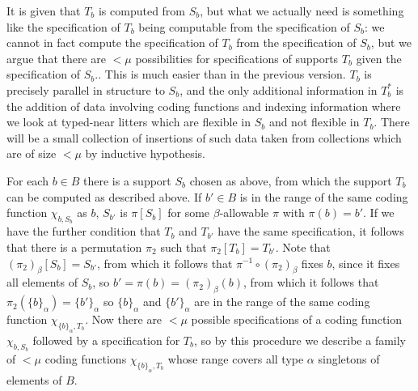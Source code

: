 \documentclass[112pt]{article}
\begin{document}
\begin{description}
It is given that $T_b$ is computed from
$S_b$, but what we actually need is something like the specification of $T_b$ being computable from the specification of $S_b$:  we cannot in fact compute the specification of $T_b$ from the specification of $S_b$, but we argue that there are $<\mu$ possibilities for specifications of supports $T_b$ given the specification of $S_b$..   This is much easier than in the previous version.
$T_b$ is precisely parallel in structure to $S_b$, and the only additional information in $T_b^*$  is the addition of data involving coding functions and indexing information where we look at typed-near litters which are flexible in $S_b$ and not flexible in $T_b$.  There will be a small collection of insertions of such data taken from collections which are of size $<\mu$ by inductive hypothesis.



For each $b \in B$ there is a support $S_b$ chosen as above, from which the support $T_b$ can be computed as described above.  If $b' \in B$ is in the range of the same coding function $\chi_{b,S_b}$ as $b$, $S_{b'}$ is $\pi[S_{b}]$ for some $\beta$-allowable $\pi$ with $\pi(b) = b'$.
If we have the further condition that $T_b$ and $T_{b'}$ have the same specification, it follows that there is a permutation $\pi_2$ such that $\pi_2[T_b] = T_{b'}$.  Note that $(\pi_2)_\beta[S_b]=S_{b'}$, from which it follows that $\pi^{-1} \circ (\pi_2)_\beta$ fixes $b$, since it fixes all elements of $S_b$, so $b'=\pi(b) = (\pi_2)_\beta(b)$, from which it follows
that $\pi_2(\{b\}_\alpha) = \{b'\}_\alpha$ so $\{b\}_\alpha$ and $\{b'\}_\alpha$ are in the range of the same coding function $\chi_{\{b\}_\alpha,T_b}$.  Now there are $<\mu$ possible specifications of a coding function $\chi_{b,S_b}$ followed by a specification for $T_b$, so by this procedure we describe a family of $<\mu$ coding functions $\chi_{\{b\}_\alpha,T_b}$ whose range covers all type $\alpha$ singletons of elements of $B$.

 



\begin{comment}


\end{comment}
\end{description}
\end{document}
